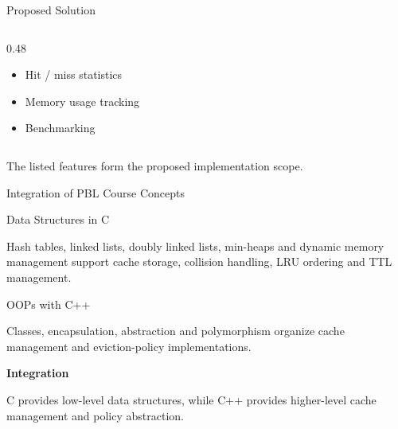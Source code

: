 \documentclass[aspectratio=169,10pt]{beamer}
\begin{document}
\begin{frame}{Proposed Solution}
\begin{columns}[T]
\begin{column}{0.48\textwidth}
\begin{itemize}
\item Hit / miss statistics

\item Memory usage tracking

\item Benchmarking

\end{itemize}

\end{column}

\end{columns}

\vfill

\small
\textcolor{GEUGrey}{
The listed features form the proposed implementation scope.
}

\end{frame}



\begin{frame}{Integration of PBL Course Concepts}

\begin{block}{Data Structures in C}

Hash tables, linked lists, doubly linked lists, min-heaps and
dynamic memory management support cache storage, collision
handling, LRU ordering and TTL management.

\end{block}

\vspace{3mm}

\begin{block}{OOPs with C++}

Classes, encapsulation, abstraction and polymorphism organize
cache management and eviction-policy implementations.

\end{block}

\vfill

\begin{center}

\colorbox{GEULightBlue}{
\parbox{0.82\textwidth}{
\centering

\textbf{\color{GEUBlue}Integration}

C provides low-level data structures, while C++ provides
higher-level cache management and policy abstraction.

}}

\end{center}

\end{frame}
\end{document}
